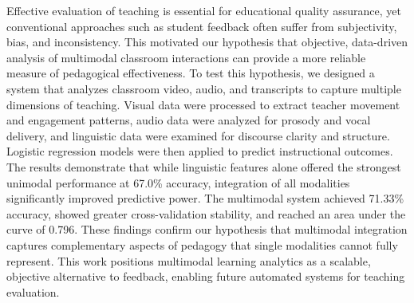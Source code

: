 \newpage
{}

Effective evaluation of teaching is essential for educational quality assurance, yet conventional approaches such as student feedback often suffer from subjectivity, bias, and inconsistency. This motivated our hypothesis that objective, data-driven analysis of multimodal classroom interactions can provide a more reliable measure of pedagogical effectiveness.
To test this hypothesis, we designed a system that analyzes classroom video, audio, and transcripts to capture multiple dimensions of teaching. Visual data were processed to extract teacher movement and engagement patterns, audio data were analyzed for prosody and vocal delivery, and linguistic data were examined for discourse clarity and structure. Logistic regression models were then applied to predict instructional outcomes.
The results demonstrate that while linguistic features alone offered the strongest unimodal performance at 67.0\% accuracy, integration of all modalities significantly improved predictive power. The multimodal system achieved 71.33\% accuracy, showed greater cross-validation stability, and reached an area under the curve of 0.796. These findings confirm our hypothesis that multimodal integration captures complementary aspects of pedagogy that single modalities cannot fully represent.
This work positions multimodal learning analytics as a scalable, objective alternative to feedback, enabling future automated systems for teaching evaluation.